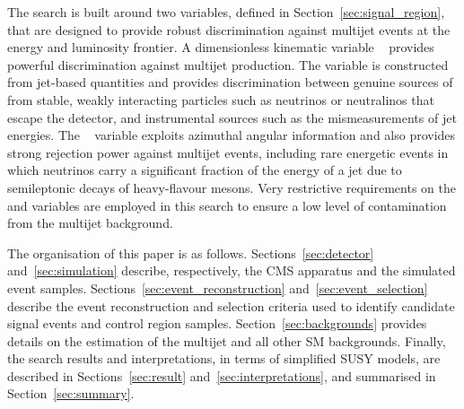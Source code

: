 The search is built around two variables, defined in
Section~\ref{sec:signal_region}, that are designed to provide robust
discrimination against multijet events at the energy and luminosity
frontier. A dimensionless kinematic variable
\alphat~\cite{Randall:2008rw, RA1Paper} provides powerful
discrimination against multijet production. The \alphat variable is
constructed from jet-based quantities and provides discrimination
between genuine sources of \ptvecmiss from stable, weakly interacting
particles such as neutrinos or neutralinos that escape the detector,
and instrumental sources such as the mismeasurements of jet energies.
The \bdphi~\cite{RA1Paper} variable exploits azimuthal angular
information and also provides strong rejection power against multijet
events, including rare energetic events in which neutrinos carry a
significant fraction of the energy of a jet due to semileptonic decays
of heavy-flavour mesons. Very restrictive requirements on the \alphat
and \dphi variables are employed in this search to ensure a low level
of contamination from the multijet background. 

The organisation of this paper is as
follows. Sections~\ref{sec:detector} and~\ref{sec:simulation}
describe, respectively, the CMS apparatus and the simulated event
samples. Sections~\ref{sec:event_reconstruction}
and~\ref{sec:event_selection} describe the event reconstruction and
selection criteria used to identify candidate signal events and
control region samples. Section~\ref{sec:backgrounds} provides details
on the estimation of the multijet and all other SM
backgrounds. Finally, the search results and interpretations, in terms
of simplified SUSY models, are described in
Sections~\ref{sec:result} and~\ref{sec:interpretations}, and
summarised in Section~\ref{sec:summary}.


